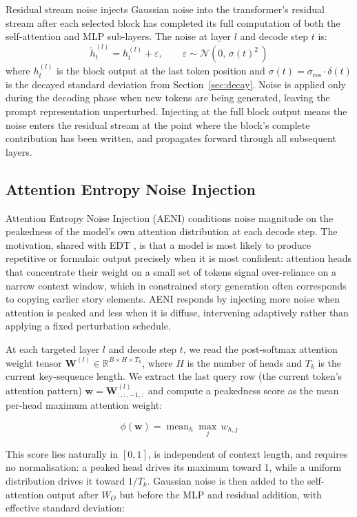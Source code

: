 \documentclass[11pt]{article}
\begin{document}
Residual stream noise injects Gaussian noise into the transformer's residual stream after each selected block has completed its full computation of both the self-attention and MLP sub-layers. The noise at layer $l$ and decode step $t$ is:
\[
    \tilde{h}^{(l)}_t = h^{(l)}_t + \varepsilon, \qquad \varepsilon \sim \mathcal{N}(0,\, \sigma(t)^2 \,)
\]
where $h^{(l)}_t$ is the block output at the last token position and $\sigma(t) = \sigma_{\mathrm{res}} \cdot \delta(t)$ is the decayed standard deviation from Section~\ref{sec:decay}. Noise is applied only during the decoding phase when new tokens are being generated, leaving the prompt representation unperturbed. Injecting at the full block output means the noise enters the residual
stream at the point where the block's complete contribution has been written, and propagates forward through all subsequent layers.

\subsection{Attention Entropy Noise Injection}

Attention Entropy Noise Injection (AENI) conditions noise magnitude on the peakedness of the model's own attention distribution at each decode step. The motivation, shared with EDT \cite{zhang2024edt}, is that a model is most likely to produce repetitive or formulaic output precisely when it is most confident: attention heads that concentrate their weight on a small set of tokens signal over-reliance on a narrow context window, which in constrained story generation often corresponds to copying earlier story elements. AENI responds by injecting more noise when attention is peaked and less when it is diffuse, intervening adaptively rather than applying a fixed perturbation schedule.

At each targeted layer $l$ and decode step $t$, we read the post-softmax
attention weight tensor $\mathbf{W}^{(l)} \in \mathbb{R}^{B \times H \times T_k}$, where $H$ is the number of heads and $T_k$ is the current key-sequence length. We extract the last query row (the current token's attention pattern)
$\mathbf{w} = \mathbf{W}^{(l)}_{:,:,-1,:}$ and compute a peakedness score as the mean per-head maximum attention weight:

\begin{equation}
    \phi(\mathbf{w}) = \operatorname{mean}_h \max_j\, w_{h,j}
\end{equation}

This score lies naturally in $[0,1]$, is independent of context length, and requires no normalisation: a peaked head drives its maximum toward 1, while a uniform distribution drives it toward $1/T_k$. Gaussian noise is then added to the self-attention output after $W_O$ but before the MLP and residual addition, with effective standard deviation:
\end{document}
